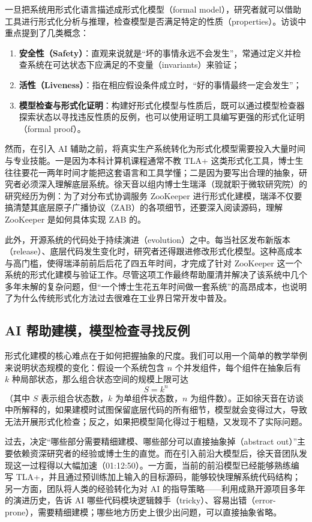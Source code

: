 \documentclass[UTF8,a4paper,11pt,fontset=fandol]{ctexart}
\begin{document}
一旦把系统用形式化语言描述成形式化模型（formal model），研究者就可以借助工具进行形式化分析与推理，检查模型是否满足特定的性质（properties）。访谈中重点提到了几类概念：
\begin{enumerate}
\item \textbf{安全性（Safety）}：直观来说就是“坏的事情永远不会发生”，常通过定义并检查系统在可达状态下应满足的不变量（invariants）来验证；
\item \textbf{活性（Liveness）}：指在相应假设条件成立时，“好的事情最终一定会发生”；
\item \textbf{模型检查与形式化证明}：构建好形式化模型与性质后，既可以通过模型检查器探索状态以寻找违反性质的反例，也可以使用证明工具编写更强的形式化证明（formal proof）。
\end{enumerate}

然而，在引入 AI 辅助之前，将真实生产系统转化为形式化模型需要投入大量时间与专业技能。一是因为本科计算机课程通常不教 TLA+ 这类形式化工具，博士生往往要花一两年时间才能把这套语言和工具学懂；二是因为要写出合理的抽象，研究者必须深入理解底层系统。徐天音以组内博士生瑞泽（现就职于微软研究院）的研究经历为例：为了对分布式协调服务 ZooKeeper 进行形式化建模，瑞泽不仅要搞清楚其底层原子广播协议（ZAB）的各项细节，还要深入阅读源码，理解 ZooKeeper 是如何具体实现 ZAB 的。

此外，开源系统的代码处于持续演进（evolution）之中。每当社区发布新版本（release）、底层代码发生变化时，研究者还得跟进修改形式化模型。这种高成本与高门槛，使得瑞泽前前后后花了四五年时间，才完成了针对 ZooKeeper 这一个系统的形式化建模与验证工作。尽管这项工作最终帮助厘清并解决了该系统中几个多年未解的复杂问题，但“一个博士生花五年时间做一套系统”的高昂成本，也说明了为什么传统形式化方法过去很难在工业界日常开发中普及。

\subsection{AI 帮助建模，模型检查寻找反例}
形式化建模的核心难点在于如何把握抽象的尺度。我们可以用一个简单的教学举例来说明状态规模的变化：假设一个系统包含 \(n\) 个并发组件，每个组件在抽象后有 \(k\) 种局部状态，那么组合状态空间的规模上限可达
\[
S = k^n
\]
（其中 \(S\) 表示组合状态数，\(k\) 为单组件状态数，\(n\) 为组件数）。正如徐天音在访谈中所解释的，如果建模时试图保留底层代码的所有细节，模型就会变得过大，导致无法开展形式化检查；反之，如果把模型简化得过于粗糙，又发现不了实际问题。

过去，决定“哪些部分需要精细建模、哪些部分可以直接抽象掉（abstract out）”主要依赖资深研究者的经验或博士生的直觉。而在引入前沿大模型后，徐天音团队发现这一过程得以大幅加速（01:12:50）。一方面，当前的前沿模型已经能够熟练编写 TLA+，并且通过预训练加上输入的目标源码，能够较快理解系统代码结构；另一方面，团队将人类的经验转化为对 AI 的指导策略——利用成熟开源项目多年的演进历史，告诉 AI 哪些代码模块逻辑棘手（tricky）、容易出错（error-prone），需要精细建模；哪些地方历史上很少出问题，可以直接抽象省略。
\end{document}
